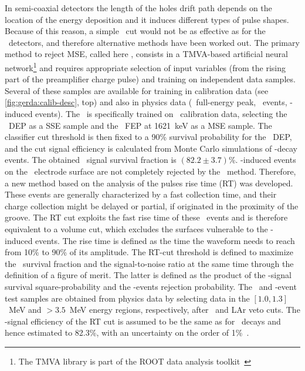 In semi-coaxial detectors the length of the holes drift path depends on the location of
the energy deposition and it induces different types of pulse shapes. Because of this
reason, a simple \aoe\ cut would not be as effective as for the \bege\ detectors, and
therefore alternative methods have been worked out.
\newpar
The primary method to reject MSE, called here \annmse, consists in a TMVA-based artificial
neural network\footnote{The TMVA library is part of the ROOT data analysis
toolkit~\cite{Brun1997}} and requires appropriate selection of input variables (from the
rising part of the preamplifier charge pulse) and training on independent data samples.
Several of these samples are available for training in calibration data (see
\cref{fig:gerda:calib-desc}, top) and also in physics data (\kvz\ full-energy peak, \nnbb\
events, \a-induced events). The \annmse\ is specifically trained on \Th\ calibration data,
selecting the \Tl\ DEP as a SSE sample and the \Bil\ FEP at 1621~keV as a MSE sample. The
classifier cut threshold is then fixed to a 90\% survival probability for the \Th\ DEP,
and the cut signal efficiency is calculated from Monte Carlo simulations of \onbb-decay
events. The obtained \annmse\ signal survival fraction is $(82.2 \pm 3.7)$\%.
\newpar
\a-induced events on the \pplus\ electrode surface are not completely rejected by the
\annmse\ method. Therefore, a new method based on the analysis of the pulses rise time
(RT) was developed. These events are generally characterized by a fast collection time,
and their charge collection might be delayed or partial, if originated in the proximity of
the groove. The RT cut exploits the fast rise time of these \a\ events and is therefore
equivalent to a volume cut, which excludes the surfaces vulnerable to the \a-induced
events. The rise time is defined as the time the waveform needs to reach from 10\% to 90\%
of its amplitude. The RT-cut threshold is defined to maximize the \onbb\ survival fraction
and the signal-to-noise ratio at the same time through the definition of a
figure of merit. The latter is defined as the product of the \nnbb-signal survival
square-probability and the \a-events rejection probability. The \nnbb\ and \a-event test
samples are obtained from physics data by selecting data in the $[1.0, 1.3]$~MeV and
$>3.5$~MeV energy regions, respectively, after \annmse\ and LAr veto cuts.  The
\onbb-signal efficiency of the RT cut is assumed to be the same as for \nnbb\ decays
and hence estimated to 82.3\%, with an uncertainty on the order of 1\%~\cite{Lazzaro2019}.

